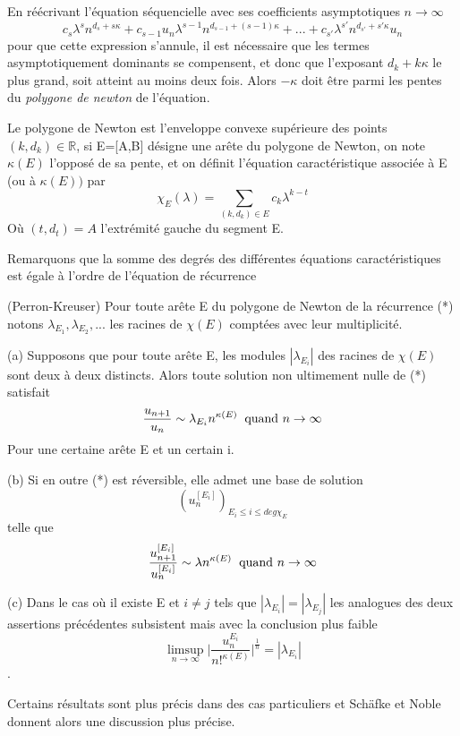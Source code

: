 \documentclass[a4paper,10.5pt]{article}
\begin{document}
	\noindent En réécrivant l'équation séquencielle avec ses coefficients asymptotiques $n \rightarrow \infty$
	\[c_{s}\lambda^{s} n^{d_{s}+s\kappa}+c_{s-1}u_{n}\lambda^{s-1} n^{d_{s-1}+(s-1)\kappa}+...+c_{s'}\lambda^{s'} n^{d_{s'}+s'\kappa}u_{n}\]
	pour que cette expression s'annule, il est nécessaire que les termes asymptotiquement dominants se compensent, et donc que l'exposant $d_{k}+k\kappa$ le plus grand, soit atteint au moins deux fois. Alors $-\kappa$ doit être parmi les pentes du \textit{polygone de newton} de l'équation.
	
	
	\begin{definition} Le polygone de Newton est l'enveloppe convexe supérieure des points $(k, d_{k}) \in \mathbb{R}$, si E=[A,B] désigne une arête du polygone de Newton, on note $\kappa(E)$ l'opposé de sa pente, et on définit l'équation caractéristique associée à E (ou à $\kappa(E))$ par
		\[\chi_{E}(\lambda)=\sum_{(k,d_{k}) \in E} c_{k}\lambda^{k-t}\]
		Où $(t,d_{t})=A$ l'extrémité gauche du segment E.
	\end{definition}
	
	Remarquons que la somme des degrés des différentes équations caractéristiques est égale à l'ordre de l'équation de récurrence 
	
	\begin{theorem} (Perron-Kreuser)
		Pour toute arête E du polygone de Newton de la récurrence (*) notons $\lambda_{E_{1}},\lambda_{E_{2}},...$ les racines de $\chi(E)$ comptées avec leur multiplicité.
		
		(a) Supposons que pour toute arête E, les modules $|\lambda_{E_{i}}|$ des racines de $\chi(E)$ sont deux à deux distincts. Alors toute solution non ultimement nulle de (*) satisfait
		\[\frac{u_{n+1}}{u_{n}}\sim \lambda_{E_{i}}n^{\kappa(E)} \hspace{2mm} \text{quand } n \rightarrow \infty\]
		Pour une certaine arête E et un certain i.
		
		(b) Si en outre (*) est réversible, elle admet une base de solution 
		\[(u_{n}^{[E_{i}]})_{E_{i}\leq i \leq deg \chi_{E}}\]
		telle que 
		\[\frac{u_{n+1}^{[E_{i}]}}{u_{n}^{[E_{i}]}}\sim \lambda n^{\kappa(E)} \hspace{2mm} \text{quand } n \rightarrow \infty\]
		
		(c) Dans le cas où il existe E et $i \neq j$ tels que $|\lambda_{E_{i}}|=|\lambda_{E_{j}}|$ les analogues des deux assertions précédentes subsistent mais avec la conclusion plus faible
		\[\limsup_{n \rightarrow \infty } \big|\frac{u_{n}^{E_{i}}}{n!^{\kappa(E)}}\big|^{\frac{1}{n}}=|\lambda_{E_{i}}|\].
	\end{theorem}
	\vspace{7mm}
	Certains résultats sont plus précis dans des cas particuliers et Schäfke et Noble donnent alors une discussion plus précise.
	
\end{document}
